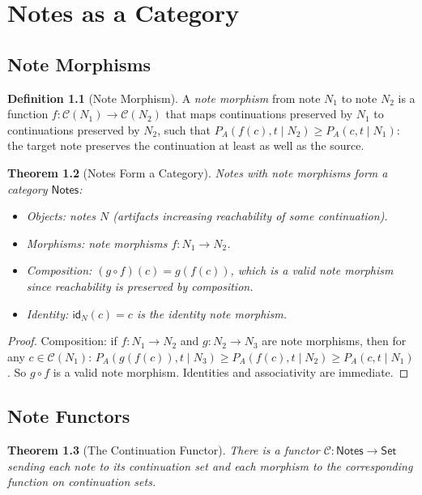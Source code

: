 \documentclass[12pt, a4paper, openany]{book}
\theoremstyle{plain}
\newtheorem{theorem}{Theorem}[chapter]
\theoremstyle{definition}
\newtheorem{definition}[theorem]{Definition}
\theoremstyle{remark}
\newcommand{\calC}{\mathcal{C}}
\begin{document}
\chapter{Notes as a Category}

\section{Note Morphisms}

\begin{definition}[Note Morphism]
A \emph{note morphism} from note $N_1$ to note $N_2$ is a function
$f : \calC(N_1) \to \calC(N_2)$ that maps continuations preserved by $N_1$
to continuations preserved by $N_2$, such that
$P_A(f(c), t \mid N_2) \geq P_A(c, t \mid N_1)$: the target note preserves
the continuation at least as well as the source.
\end{definition}

\begin{theorem}[Notes Form a Category]
Notes with note morphisms form a category $\mathsf{Notes}$:
\begin{itemize}
\item Objects: notes $N$ (artifacts increasing reachability of some continuation).
\item Morphisms: note morphisms $f : N_1 \to N_2$.
\item Composition: $(g \circ f)(c) = g(f(c))$, which is a valid note morphism
since reachability is preserved by composition.
\item Identity: $\mathsf{id}_N(c) = c$ is the identity note morphism.
\end{itemize}
\end{theorem}

\begin{proof}
Composition: if $f : N_1 \to N_2$ and $g : N_2 \to N_3$ are note morphisms,
then for any $c \in \calC(N_1)$:
$P_A(g(f(c)), t \mid N_3) \geq P_A(f(c), t \mid N_2) \geq P_A(c, t \mid N_1)$.
So $g \circ f$ is a valid note morphism. Identities and associativity are immediate.
\end{proof}

\section{Note Functors}

\begin{theorem}[The Continuation Functor]
There is a functor $\calC : \mathsf{Notes} \to \mathsf{Set}$ sending each note
to its continuation set and each morphism to the corresponding function on
continuation sets.
\end{theorem}
\end{document}
